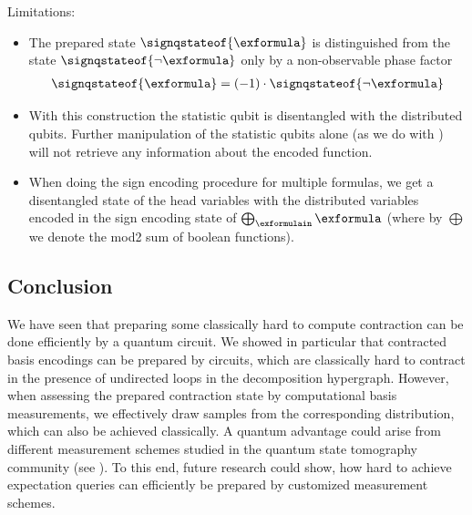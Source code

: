 Limitations:
\begin{itemize}
    \item The prepared state $\signqstateof{\exformula}$ is distinguished from the state $\signqstateof{\lnot\exformula}$ only by a non-observable phase factor
    \begin{align*}
        \signqstateof{\exformula}
        = (-1) \cdot \signqstateof{\lnot\exformula}
    \end{align*}
    \item With this construction the statistic qubit is disentangled with the distributed qubits.
    Further manipulation of the statistic qubits alone (as we do with \activationCircuits{}) will not retrieve any information about the encoded function.
    \item When doing the sign encoding procedure for multiple formulas, we get a disentangled state of the head variables with the distributed variables encoded in the sign encoding state of $\bigoplus_{\exformulain}\exformula$ (where by $\bigoplus$ we denote the mod2 sum of boolean functions).
\end{itemize}



\subsection{Conclusion}

We have seen that preparing some classically hard to compute contraction can be done efficiently by a quantum circuit.
We showed in particular that contracted basis encodings can be prepared by circuits, which are classically hard to contract in the presence of undirected loops in the decomposition hypergraph.
However, when assessing the prepared contraction state by computational basis measurements, we effectively draw samples from the corresponding distribution, which can also be achieved classically.
A quantum advantage could arise from different measurement schemes studied in the quantum state tomography community (see \cite{gross_quantum_2010,cramer_efficient_2010,roth_semi-device-dependent_2023}).
To this end, future research could show, how hard to achieve expectation queries can efficiently be prepared by customized measurement schemes.